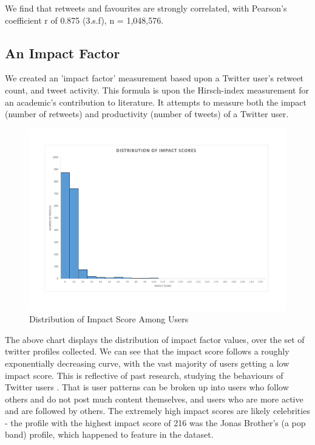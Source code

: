We find that retweets and favourites are strongly correlated, with Pearson's coefficient r of 0.875 (3.s.f), n = 1,048,576. 


\subsection{An Impact Factor}

We created an 'impact factor' measurement based upon a Twitter user's retweet count, and tweet activity. This formula is upon the Hirsch-index \cite{} measurement for an academic's contribution to literature. It attempts to measure both the impact (number of retweets) and productivity (number of tweets) of a Twitter user. 

\begin{figure}[h!]
\centering
\includegraphics[width=500px]{Images/impact_distribution_histogram.pdf}
\caption{Distribution of Impact Score Among Users}
\end{figure}

The above chart displays the distribution of impact factor values, over the set of twitter profiles collected. We can see that the impact score follows a roughly exponentially decreasing curve, with the vast majority of users getting a low impact score. This is reflective of past research, studying the behaviours of Twitter users \cite{}. That is user patterns can be broken up into users who follow others and do not post much content themselves, and users who are more active and are followed by others. The extremely high impact scores are likely celebrities - the profile with the highest impact score of 216 was the Jonas Brother's (a pop band) profile, which happened to feature in the dataset. 

